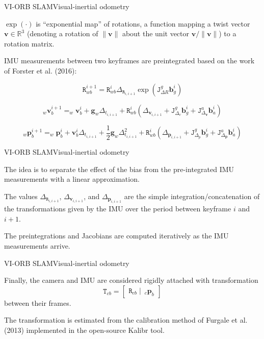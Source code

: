 \documentclass[aspectratio=169]{beamer}
\renewcommand{\vec}[1]{\boldsymbol{#1}}
\newcommand{\mat}[1]{\mathtt{#1}}
\def\Rset{\mathbb{R}}
\begin{document}
\begin{frame}{VI-ORB SLAM}{Visual-inertial odometry}

$\exp(\cdot)$ is ``exponential map'' of rotations, a function mapping a
twist vector $\vec{v} \in \Rset^3$
(denoting a rotation of $\|\vec{v}\|$ about the
unit vector $\vec{v}/\|\vec{v}\|$) to a rotation matrix.

\medskip

IMU measurements between two keyframes are preintegrated based on
the work of Forster et al. (2016):
   
   $$\mat{R}_{wb}^{i+1} = \mat{R}_{wb}^i\Delta_{\mat{R}_{i,i+1}}\exp(\mat{J}^g_{\Delta R}\vec{b}^i_g)$$

   $$_w\vec{v}_b^{i+1} = _w\vec{v}^i_b + \vec{g}_w\Delta_{t_{i,i+1}} +
      \mat{R}_{wb}^i(\Delta_{\vec{v}_{i,i+1}} + \mat{J}^g_{\Delta_v}\vec{b}^i_g
      + \mat{J}^a_{\Delta_{\vec{v}}}\vec{b}^i_a)$$

   $$_w\vec{p}_b^{i+1} = _w\vec{p}^i_b + \vec{v}^i_b\Delta_{t_{i,i+1}} +
      \frac{1}{2}\vec{g}_w\Delta_{t_{i,i+1}}^2 +
      \mat{R}_{wb}^i\left(\Delta_{\vec{p}_{i,i+1}} + \mat{J}^g_{\Delta_p}\vec{b}^i_g
      + \mat{J}^a_{\Delta_{\vec{p}}}\vec{b}^i_a\right)$$

\end{frame}


\begin{frame}{VI-ORB SLAM}{Visual-inertial odometry}

  The idea is to separate the effect of the bias from the pre-integrated
  IMU measurements with a linear approximation.

  \medskip

  The values $\Delta_{\mat{R}_{i,i+1}}$,
             $\Delta_{\vec{v}_{i,i+1}}$, and
             $\Delta_{\vec{p}_{i,i+1}}$ are the
  simple integration/concatenation
  of the transformations given by the IMU over the period between
  keyframe $i$ and $i+1$.
  

  The preintegrations and Jacobians are computed iteratively as the IMU
  measurements arrive.

\end{frame}


\begin{frame}{VI-ORB SLAM}{Visual-inertial odometry}

Finally, the
camera and IMU are considered rigidly attached with transformation
$$\mat{T}_{cb} = \begin{bmatrix} \mat{R}_{cb} \mid\ _c\vec{p}_b \end{bmatrix}$$
between their frames.

\medskip

The transformation is estimated from the calibration
method of Furgale et al. (2013) implemented in the open-source \alert{Kalibr}
tool.

\end{frame}
\end{document}
